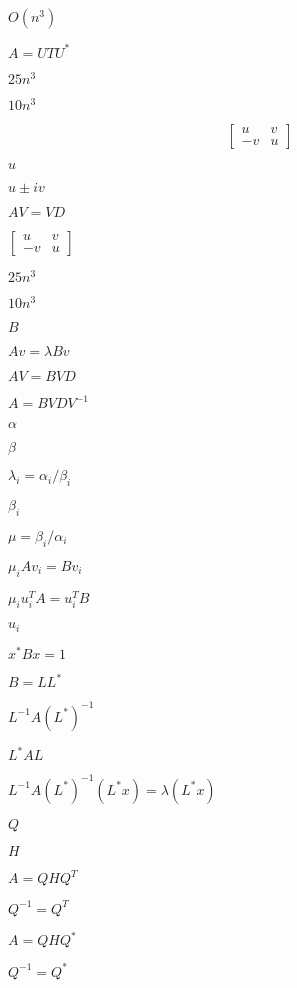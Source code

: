 \documentclass{article}
\begin{document}
$ O(n^3) $
\pagebreak

$ A = U T U^*$
\pagebreak

$25n^3$
\pagebreak

$10n^3$
\pagebreak

\[ \begin{bmatrix} u & v \\ -v & u \end{bmatrix} \]
\pagebreak

$ u $
\pagebreak

$ u \pm iv $
\pagebreak

$ AV = VD $
\pagebreak

$ \begin{bmatrix} u & v \\ -v & u \end{bmatrix} $
\pagebreak

$ 25n^3 $
\pagebreak

$ 10n^3 $
\pagebreak

$ B $
\pagebreak

$ Av = \lambda Bv $
\pagebreak

$ A V = B V D $
\pagebreak

$ A = B V D V^{-1} $
\pagebreak

$ \alpha $
\pagebreak

$ \beta $
\pagebreak

$ \lambda_i = \alpha_i / \beta_i $
\pagebreak

$ \beta_i $
\pagebreak

$ \mu = \beta_i / \alpha_i$
\pagebreak

$ \mu_i A v_i = B v_i $
\pagebreak

$ \mu_i u_i^T A = u_i^T B $
\pagebreak

$ u_i $
\pagebreak

$ x^* B x = 1 $
\pagebreak

$ B = LL^* $
\pagebreak

$ L^{-1} A (L^*)^{-1} $
\pagebreak

$ L^{*} A L $
\pagebreak

$ L^{-1} A (L^*)^{-1} (L^* x) = \lambda (L^* x) $
\pagebreak

$ Q $
\pagebreak

$ H $
\pagebreak

$ A = Q H Q^T $
\pagebreak

$ Q^{-1} = Q^T $
\pagebreak

$ A = Q H Q^* $
\pagebreak

$ Q^{-1} = Q^* $
\pagebreak
\end{document}
